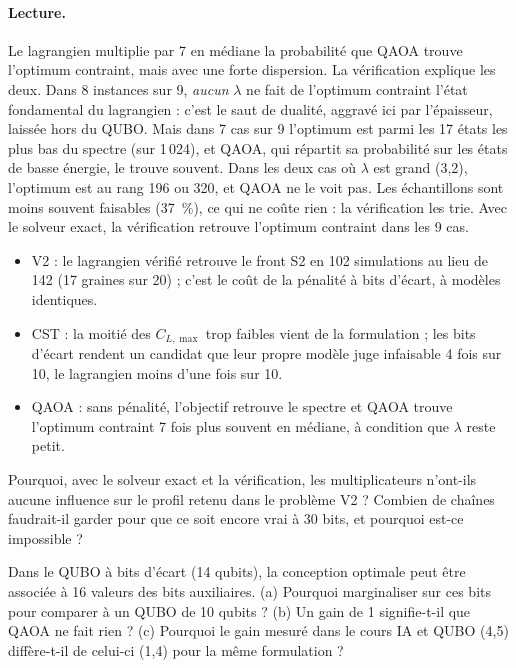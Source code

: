 \paragraph{Lecture.} Le lagrangien multiplie par 7 en médiane la probabilité que QAOA trouve l'optimum contraint, mais avec une forte dispersion. La vérification explique les deux. Dans 8 instances sur 9, \emph{aucun} $\lambda$ ne fait de l'optimum contraint l'état fondamental du lagrangien : c'est le saut de dualité, aggravé ici par l'épaisseur, laissée hors du QUBO. Mais dans 7 cas sur 9 l'optimum est parmi les 17 états les plus bas du spectre (sur 1\,024), et QAOA, qui répartit sa probabilité sur les états de basse énergie, le trouve souvent. Dans les deux cas où $\lambda$ est grand (3,2), l'optimum est au rang 196 ou 320, et QAOA ne le voit pas. Les échantillons sont moins souvent faisables (37~\%), ce qui ne coûte rien : la vérification les trie. Avec le solveur exact, la vérification retrouve l'optimum contraint dans les 9 cas.

\begin{resultat}
\begin{itemize}
\item V2 : le lagrangien vérifié retrouve le front S2 en 102 simulations au lieu de 142 (17 graines sur 20) ; c'est le coût de la pénalité à bits d'écart, à modèles identiques.
\item CST : la moitié des $C_{L,\max}$ trop faibles vient de la formulation ; les bits d'écart rendent un candidat que leur propre modèle juge infaisable 4 fois sur 10, le lagrangien moins d'une fois sur 10.
\item QAOA : sans pénalité, l'objectif retrouve le spectre et QAOA trouve l'optimum contraint 7 fois plus souvent en médiane, à condition que $\lambda$ reste petit.
\end{itemize}
\end{resultat}

\exercices
\begin{exercice}\label{ex:hl-exact}
Pourquoi, avec le solveur exact et la vérification, les multiplicateurs n'ont-ils aucune influence sur le profil retenu dans le problème V2 ? Combien de chaînes faudrait-il garder pour que ce soit encore vrai à 30 bits, et pourquoi est-ce impossible ?
\end{exercice}
\begin{exercice}\label{ex:hl-gain}
Dans le QUBO à bits d'écart (14 qubits), la conception optimale peut être associée à 16 valeurs des bits auxiliaires. (a) Pourquoi marginaliser sur ces bits pour comparer à un QUBO de 10 qubits ? (b) Un gain de 1 signifie-t-il que QAOA ne fait rien ? (c) Pourquoi le gain mesuré dans le cours IA et QUBO (4,5) diffère-t-il de celui-ci (1,4) pour la même formulation ?
\end{exercice}

